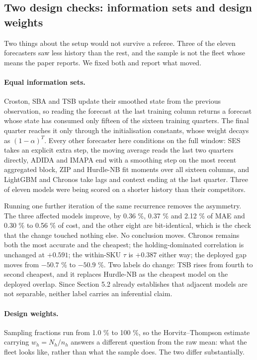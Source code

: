 \documentclass[11pt]{article}
\begin{document}
\subsection{Two design checks: information sets and design weights}

Two things about the setup would not survive a referee. Three of the eleven
forecasters saw less history than the rest, and the sample is not the fleet
whose means the paper reports. We fixed both and report what moved.

\paragraph{Equal information sets.} Croston, SBA and TSB update their smoothed
state from the previous observation, so reading the forecast at the last
training column returns a forecast whose state has consumed only fifteen of the
sixteen training quarters. The final quarter reaches it only through the
initialisation constants, whose weight decays as $(1-\alpha)^{T}$. Every other
forecaster here conditions on the full window: SES takes an explicit extra
step, the moving average reads the last two quarters directly, ADIDA and IMAPA
end with a smoothing step on the most recent aggregated block, ZIP and
Hurdle-NB fit moments over all sixteen columns, and LightGBM and Chronos take
lags and context ending at the last quarter. Three of eleven models were being
scored on a shorter history than their competitors.

Running one further iteration of the same recurrence removes the asymmetry. The
three affected models improve, by 0.36 \%, 0.37 \% and 2.12 \% of MAE and
0.30 \% to 0.56 \% of cost, and the other eight are bit-identical, which is the
check that the change touched nothing else. No conclusion moves. Chronos
remains both the most accurate and the cheapest; the holding-dominated
correlation is unchanged at $+0.591$; the within-SKU $\tau$ is $+0.387$ either
way; the deployed gap moves from $-50.7$ \% to $-50.9$ \%. Two labels do
change: TSB rises from fourth to second cheapest, and it replaces Hurdle-NB as
the cheapest model on the deployed overlap. Since Section 5.2 already
establishes that adjacent models are not separable, neither label carries an
inferential claim.

\paragraph{Design weights.} Sampling fractions run from 1.0 \% to 100 \%, so
the Horvitz--Thompson estimate carrying $w_h = N_h/n_h$ answers a different
question from the raw mean: what the fleet looks like, rather than what the
sample does. The two differ substantially.
\end{document}
